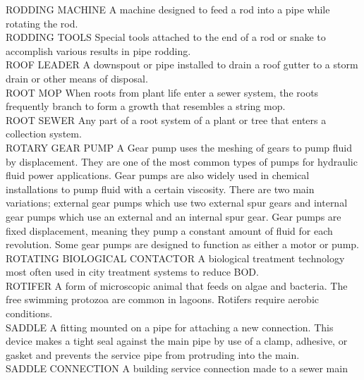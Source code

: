\documentclass{article}
\begin{document}
RODDING MACHINE
A machine designed to feed a rod into a pipe while rotating the rod.
\vspace{0.3cm}\\
RODDING TOOLS
Special tools attached to the end of a rod or snake to accomplish various results in pipe rodding. 
\vspace{0.3cm}\\
ROOF LEADER
A downspout or pipe installed to drain a roof gutter to a storm drain or other means of disposal. 
\vspace{0.3cm}\\
ROOT MOP
When roots from plant life enter a sewer system, the roots frequently branch to form a growth that resembles a string mop. 
\vspace{0.3cm}\\
ROOT SEWER
Any part of a root system of a plant or tree that enters a collection system. 
\vspace{0.3cm}\\
ROTARY GEAR PUMP
A Gear pump uses the meshing of gears to pump fluid by displacement. They are one of the most common types of pumps for hydraulic fluid power applications. Gear pumps are also widely used in chemical installations to pump fluid with a certain viscosity. There are two main variations; external gear pumps which use two external spur gears and internal gear pumps which use an external and an internal spur gear. Gear pumps are fixed displacement, meaning they pump a constant amount of fluid for each revolution. Some gear pumps are designed to function as either a motor or pump.
\vspace{0.3cm}\\
ROTATING BIOLOGICAL CONTACTOR
A biological treatment technology most often used in city treatment systems to reduce BOD.
\vspace{0.3cm}\\
ROTIFER
A form of microscopic animal that feeds on algae and bacteria. The free swimming protozoa are common in lagoons. Rotifers require aerobic conditions.
\vspace{0.3cm}\\
SADDLE
A fitting mounted on a pipe for attaching a new connection. This device makes a tight seal against the main pipe by use of a clamp, adhesive, or gasket and prevents the service pipe from protruding into the main. 
\vspace{0.3cm}\\
SADDLE CONNECTION
A building service connection made to a sewer main 
\vspace{0.3cm}\\
\end{document}
